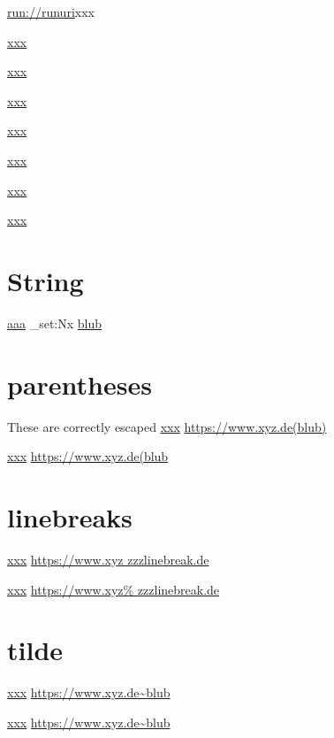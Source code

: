 \documentclass{article}
\begin{document}
\url{run://runuri}{xxx}

\href{:emptyprefixGoToR}{xxx}

\href{file:fileprefixGoToR}{xxx}

\href{run:runprefixLaunch}{xxx}

\href{blub:blubprefixURI}{xxx}

\href{nocolonnodotGoToR}{xxx}

\href{colonURI.dot}{xxx}

\href{colonGoToR.pdf}{xxx}


\section{String}

\def\blub{file://www.teststrings.de}
\href{\blub}{aaa}
\ExplSyntaxOn %
\str_set:Nx
\href{\ltmpastr}{blub}
\ExplSyntaxOff


\section{parentheses}
These are correctly escaped
\href{https://www.xyz.de(blub)}{xxx}
\url{https://www.xyz.de(blub)}

\href{https://www.xyz.de(blub}{xxx}
\url{https://www.xyz.de(blub}



\section{linebreaks}

\href{https://www.xyz
 zzzlinebreak.de}{xxx}
\url{https://www.xyz
zzzlinebreak.de}

\href{https://www.xyz%
zzzlinebreak.de}{xxx}
\url{https://www.xyz%
zzzlinebreak.de}


\section{tilde}
\href{https://www.xyz.de~blub}{xxx}
\url{https://www.xyz.de~blub}

\href{https://www.xyz.de\~blub}{xxx}
\url{https://www.xyz.de\~blub}
\end{document}
